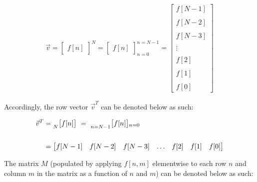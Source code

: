 \documentclass{article}
\begin{document}
\begin{align*}
    \vec{v} = \begin{bmatrix} f[n] \end{bmatrix}^{N}
            = \begin{bmatrix} f[n] \end{bmatrix}^{n=N - 1}_{n=0}
            = \begin{bmatrix}
                    f[N - 1] \\ \\
                    f[N - 2] \\ \\
                    f[N - 3] \\ \\
                      \vdots \\ \\
                    f[    2] \\ \\
                    f[    1] \\ \\
                    f[    0] 
                \end{bmatrix}
  \end{align*}

Accordingly, the row vector $\vec{v}^{T}$ can be denoted below as such:

\begin{align*}
    \vec{v}^{T}&=   \prescript{}{N}{\begin{bmatrix} f[n] \end{bmatrix}} \ 
                = \ \prescript{}{n=N - 1}{\begin{bmatrix} f[n] \end{bmatrix}}_{n=0} \\ \\
               &= \begin{bmatrix} f[N - 1] & f[N - 2] & f[N - 3] & \ldots & f[2] & f[1] & f[0] \end{bmatrix} \\
  \end{align*} 

The matrix $M$ (populated by applying $f[n, m]$ elementwise to each row $n$ and column $m$ in the matrix as a function of $n$ and $m$) can be denoted below as such:
\end{document}
